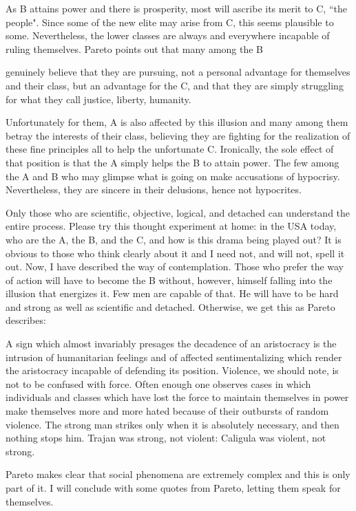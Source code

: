 As B attains power and there is prosperity, most will ascribe its merit to C, ``the people". Since some of the new elite may arise from C, this seems plausible to some. Nevertheless, the lower classes are always and everywhere incapable of ruling themselves. Pareto points out that many among the B

\begin{quotex}
genuinely believe that they are pursuing, not a personal advantage for themselves and their class, but an advantage for the C, and that they are simply struggling for what they call justice, liberty, humanity. 

\end{quotex}
Unfortunately for them, A is also affected by this illusion and many among them betray the interests of their class, believing they are fighting for the realization of these fine principles all to help the unfortunate C. Ironically, the sole effect of that position is that the A simply helps the B to attain power. The few among the A and B who may glimpse what is going on make accusations of hypocrisy. Nevertheless, they are sincere in their delusions, hence not hypocrites.

Only those who are scientific, objective, logical, and detached can understand the entire process. Please try this thought experiment at home: in the USA today, who are the A, the B, and the C, and how is this drama being played out? It is obvious to those who think clearly about it and I need not, and will not, spell it out. Now, I have described the way of contemplation. Those who prefer the way of action will have to become the B without, however, himself falling into the illusion that energizes it. Few men are capable of that. He will have to be hard and strong as well as scientific and detached. Otherwise, we get this as Pareto describes:

\begin{quotex}
A sign which almost invariably presages the decadence of an aristocracy is the intrusion of humanitarian feelings and of affected sentimentalizing which render the aristocracy incapable of defending its position. Violence, we should note, is not to be confused with force. Often enough one observes cases in which individuals and classes which have lost the force to maintain themselves in power make themselves more and more hated because of their outbursts of random violence. The strong man strikes only when it is absolutely necessary, and then nothing stops him. Trajan was strong, not violent: Caligula was violent, not strong. 

\end{quotex}
Pareto makes clear that social phenomena are extremely complex and this is only part of it. I will conclude with some quotes from Pareto, letting them speak for themselves.

